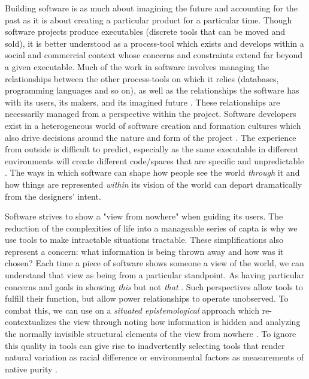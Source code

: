 \documentclass[a4paper,man,natbib]{apa6}
\begin{document}
   Building software is as much about imagining the future and accounting for the past as it is about creating a particular product for a particular time. Though software projects produce executables (discrete tools that can be moved and sold), it is better understood as a process-tool which exists and develops within a social and commercial context whose concerns and constraints extend far beyond a given executable. Much of the work in software involves managing the relationships between the other process-tools on which it relies (databases, programming languages and so on), as well as the relationships the software has with its users, its makers, and its imagined future \citep{Mackenzie2006-hb}. These relationships are necessarily managed from a perspective within the project. Software developers exist in a heterogeneous world of software creation and formation cultures which also drive decisions around the nature and form of the project \citep{Ensmenger2012-kz,Gabriella_Coleman2012-lq, Kelty2008-jm}. The experience from outside is difficult to predict, especially as the same executable in different environments will create different code/spaces that are specific and unpredictable \citep{Kitchin2011-af}. The ways in which software can shape how people see the world \textit{through} it and how things are represented \textit{within} its vision of the world can depart dramatically from the designers' intent.

   Software strives to show a "view from nowhere" when guiding its users. The reduction of the complexities of life into a manageable series of \gls{capta} is why we use tools to make intractable situations tractable. These simplifications also represent a concern: what information is being thrown away and how was it chosen? Each time a piece of software shows someone a view of the world, we can understand that view as being from a particular standpoint. As having particular concerns and goals in showing \textit{this} but not \textit{that} \citep{Harding1992-od}. Such perspectives allow tools to fulfill their function, but allow power relationships to operate unobserved. To combat this, we can use on a \textit{situated epistemological} approach which re-contextualizes the view through noting how information is hidden and analyzing the normally invisible structural elements of the view from nowhere \citep{Haraway1988-nh}. To ignore this quality in tools can give rise to inadvertently selecting tools that render natural variation as racial difference or environmental factors as measurements of native purity \citep{Subramaniam2014-wg}.
\end{document}
